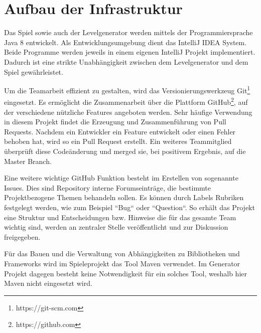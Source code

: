 \section{Aufbau der Infrastruktur}

Das Spiel sowie auch der Levelgenerator werden mittels der Programmiersprache Java 8 entwickelt. 
Als Entwicklungsumgebung dient das IntelliJ IDEA System.
Beide Programme werden jeweils in einem eigenen IntelliJ Projekt implementiert.
Dadurch ist eine strikte Unabhängigkeit zwischen dem Levelgenerator und dem Spiel gewährleistet.

Um die Teamarbeit effizient zu gestalten, wird das Versionierungswerkzeug Git\footnote{https://git-scm.com} eingesetzt.
Es ermöglicht die Zusammenarbeit über die Plattform GitHub\footnote{https://github.com}, auf der verschiedene nützliche Features angeboten werden.
Sehr häufige Verwendung in diesem Projekt findet die Erzeugung und Zusammenführung von Pull Requests.
Nachdem ein Entwickler ein Feature entwickelt oder einen Fehler behoben hat, wird so ein Pull Request erstellt.
Ein weiteres Teammitglied überprüft diese Codeänderung und merged sie, bei positivem Ergebnis, auf die Master Branch.

Eine weitere wichtige GitHub Funktion besteht im Erstellen von sogenannte Issues.
Dies sind Repository interne Forumseinträge, die bestimmte Projektbezogene Themen behandeln sollen.
Es können durch Labels Rubriken festgelegt werden, wie zum Beispiel ``Bug`` oder ``Question``.
So erhält das Projekt eine Struktur und Entscheidungen bzw. Hinweise die für das gesamte Team wichtig sind, werden an zentraler Stelle veröffentlicht und zur Diskussion freigegeben.

Für das Bauen und die Verwaltung von Abhängigkeiten zu Bibliotheken und Frameworks wird im Spieleprojekt das Tool Maven verwendet.
Im Generator Projekt dagegen besteht keine Notwendigkeit für ein solches Tool, weshalb hier Maven nicht eingesetzt wird.
